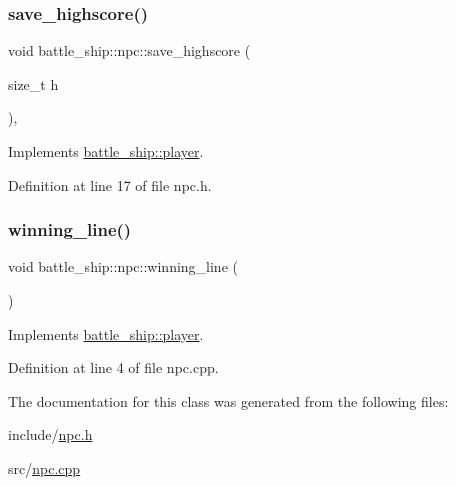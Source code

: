 \subsubsection{\texorpdfstring{save\+\_\+highscore()}{save\_highscore()}}
{\footnotesize\ttfamily void battle\+\_\+ship\+::npc\+::save\+\_\+highscore (\begin{DoxyParamCaption}\item[{size\+\_\+t}]{h }\end{DoxyParamCaption})\hspace{0.3cm}{\ttfamily [inline]}, {\ttfamily [virtual]}}



Implements \hyperlink{classbattle__ship_1_1player_a928538249678aea5402f8c673671e995}{battle\+\_\+ship\+::player}.



Definition at line 17 of file npc.\+h.

\mbox{\label{classbattle__ship_1_1npc_a10c65edd38e75ac6be91ecd2dc9c9866}} 
\subsubsection{\texorpdfstring{winning\+\_\+line()}{winning\_line()}}
{\footnotesize\ttfamily void battle\+\_\+ship\+::npc\+::winning\+\_\+line (\begin{DoxyParamCaption}{ }\end{DoxyParamCaption})\hspace{0.3cm}{\ttfamily [virtual]}}



Implements \hyperlink{classbattle__ship_1_1player_a3110ec708fd8fc7e02a6e88a63d57d2f}{battle\+\_\+ship\+::player}.



Definition at line 4 of file npc.\+cpp.



The documentation for this class was generated from the following files\+:\begin{DoxyCompactItemize}
\item 
include/\hyperlink{npc_8h}{npc.\+h}\item 
src/\hyperlink{npc_8cpp}{npc.\+cpp}\end{DoxyCompactItemize}
